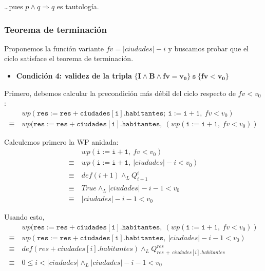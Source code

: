 \documentclass[10pt,a4paper]{article}
\begin{document}
\ldots pues $p \land q \Rightarrow q$ es tautología.



\subsubsection{Teorema de terminación}
Proponemos la función variante $fv = |ciudades| - i$ y buscamos probar que el ciclo satisface el teorema de terminación. \\

\begin{itemize}
    \item{\textbf{Condición 4: validez de la tripla} $\mathbf{\{I \land B \land fv = v_0\} \ \texttt{s} \ \{fv < v_0\}}$}
\end{itemize}
Primero, debemos calcular la precondición más débil del ciclo respecto de $fv < v_0$:
\begin{equation*} 
    \begin{split}
    & wp(\mathtt{res := res + ciudades[i].habitantes; \ i := i + 1}, \ fv < v_0) \\
    \equiv \ & wp(\mathtt{res := res + ciudades[i].habitantes}, \ (wp(\mathtt{i := i + 1}, \ fv < v_0))
    \end{split}
\end{equation*}

Calculemos primero la WP anidada:
\begin{equation*}
    \begin{split}
    & wp(\mathtt{i := i + 1}, \ fv < v_0) \\
    \equiv \ & wp(\mathtt{i := i + 1}, \ |ciudades| - i < v_0) \\
    \equiv \ & def(i + 1) \land_L Q_{i + 1}^{i} \\
    \equiv \ & True \land_L |ciudades| - i - 1 < v_0 \\
    \equiv \ & |ciudades| - i - 1 < v_0
    \end{split}
\end{equation*}

Usando esto,
\begin{equation*}
    \begin{split}
    & wp(\mathtt{res := res + ciudades[i].habitantes}, \ (wp(\mathtt{i := i + 1}, \ fv < v_0)) \\
    \equiv \ & wp(\mathtt{res := res + ciudades[i].habitantes}, \ |ciudades| - i - 1 < v_0) \\
    \equiv \ & def(res + ciudades[i].habitantes) \land_L Q_{res \ + \ ciudades[i].habitantes}^{res} \\
    \equiv \ & 0 \leq i < |ciudades| \land_L |ciudades| - i - 1 < v_0 \\
    \end{split}
\end{equation*}
\end{document}

